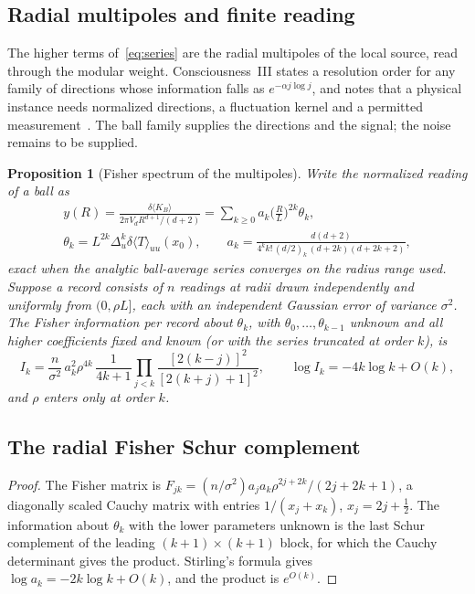 \documentclass[12pt]{article}
\newtheorem{proposition}[theorem]{Proposition}
\theoremstyle{definition}
\theoremstyle{remark}
\newcommand{\dT}{\delta\langle T\rangle}
\newcommand{\ev}[1]{\langle #1\rangle}
\begin{document}
\subsection{Radial multipoles and finite reading}

The higher terms of~\eqref{eq:series} are the radial multipoles of the local source, read
through the modular weight. Consciousness~III states a resolution
order for any family of directions whose information falls as \(e^{-\alpha j\log j}\), and
notes that a physical instance needs normalized directions, a fluctuation kernel and a
permitted measurement~\cite{PaperIII}. The ball family supplies the directions and the
signal; the noise remains to be supplied.

\begin{proposition}[Fisher spectrum of the multipoles]\label{prop:multipoles}
Write the normalized reading of a ball as
\begin{gather*}
y(R)=\frac{\delta\ev{K_B}}{2\pi V_dR^{d+1}/(d+2)}=\sum_{k\ge0}a_k\Big(\frac RL\Big)^{2k}\theta_k,\\
\theta_k=L^{2k}\Delta_u^k\dT_{uu}(x_0),\qquad
a_k=\frac{d(d+2)}{4^kk!\,(d/2)_k\,(d+2k)(d+2k+2)},
\end{gather*}
exact when the analytic ball-average series converges on the radius range used.
Suppose a record consists of \(n\) readings at radii drawn
independently and uniformly from \((0,\rho L]\), each with an independent Gaussian error of
variance \(\sigma^2\). The Fisher information per record about \(\theta_k\), with
\(\theta_0,\dots,\theta_{k-1}\) unknown and all higher coefficients fixed and known
(or with the series truncated at order \(k\)), is
\[
I_k=\frac{n}{\sigma^2}\,a_k^2\rho^{4k}\,\frac1{4k+1}\prod_{j<k}\frac{[2(k-j)]^2}{[2(k+j)+1]^2},
\qquad \log I_k=-4k\log k+O(k),
\]
and \(\rho\) enters only at order \(k\).
\end{proposition}

\subsection{The radial Fisher Schur complement}
\label{app:prop:multipoles}
\begin{proof}
The Fisher matrix is \(F_{jk}=(n/\sigma^2)a_ja_k\rho^{2j+2k}/(2j+2k+1)\), a diagonally scaled
Cauchy matrix with entries \(1/(x_j+x_k)\), \(x_j=2j+\frac12\). The information about
\(\theta_k\) with the lower parameters unknown is the last Schur complement of the leading
\((k+1)\times(k+1)\) block, for which the Cauchy determinant gives the product. Stirling's
formula gives \(\log a_k=-2k\log k+O(k)\), and the product is \(e^{O(k)}\).
\end{proof}
\end{document}
